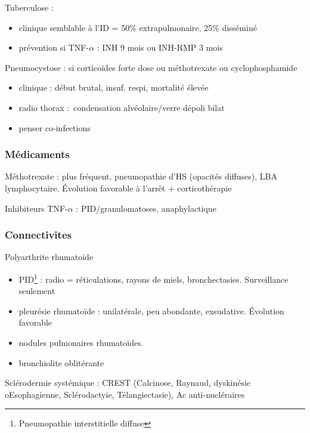 \documentclass[11pt]{article}
\begin{document}
Tuberculose : 

\begin{itemize}
\item clinique semblable à l'ID = 50\% extrapulmonaire, 25\% disséminé
\item prévention si TNF-\(\alpha\) : INH 9 mois ou INH-RMP 3 mois
\end{itemize}

Pneumocystose : si corticoïdes forte dose ou méthotrexate ou
cyclophosphamide

\begin{itemize}
\item clinique : début brutal, insuf. respi, mortalité élevée
\item radio thorax : condensation alvéolaire/verre dépoli bilat
\item penser co-infections
\end{itemize}

\subsubsection{Médicaments}
\label{sec:org450f35b}
Méthotrexate : plus fréquent, pneumopathie d'HS (opacités diffuses), \gls{LBA}
lymphocytaire. Évolution favorable à l'arrêt + corticothérapie

Inhibiteurs TNF-\(\alpha\) : PID/granulomatoses, anaphylactique

\subsubsection{Connectivites}
\label{sec:org60f9944}
Polyarthrite rhumatoide

\begin{itemize}
\item PID\footnote{Pneumopathie interstitielle diffuse} : radio =
réticulations, rayons de miels, bronchectasies. Surveillance seulement
\item pleurésie rhumatoïde : unilatérale, peu abondante, exsudative. Évolution
favorable
\item nodules pulmonaires rhumatoïdes.
\item bronchiolite oblitérante
\end{itemize}

Sclérodermie systémique : CREST (Calcinose, Raynaud, dyskinésie oEsophagienne,
Sclérodactyie, Télangiectasie), Ac anti-nucléraires

\end{document}
